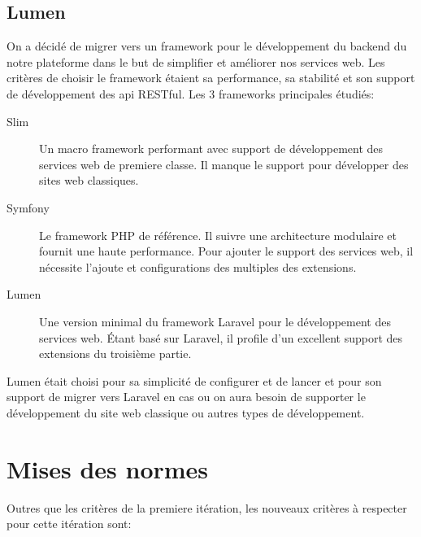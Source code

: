 \subsection{Lumen}

On a décidé de migrer vers un framework pour le développement du backend du
notre plateforme dans le but de simplifier et améliorer nos services web. Les
critères de choisir le framework étaient sa performance, sa stabilité et son
support de développement des api RESTful. Les 3 frameworks principales étudiés:

\begin{description}
    \item [Slim] Un macro framework performant avec support de développement
        des services web de premiere classe. Il manque le support pour
        développer des sites web classiques.
    \item [Symfony] Le framework PHP de référence. Il suivre une architecture
        modulaire et fournit une haute performance. Pour ajouter le support des
        services web, il nécessite l'ajoute et configurations des multiples des
        extensions.
    \item [Lumen] Une version minimal du framework Laravel pour le
        développement des services web. Étant basé sur Laravel, il profile d'un
        excellent support des extensions du troisième partie.
\end{description}

Lumen était choisi pour sa simplicité de configurer et de lancer et pour son
support de migrer vers Laravel en cas ou on aura besoin de supporter le
développement du site web classique ou autres types de développement.



\section{Mises des normes}

Outres que les critères de la premiere itération, les nouveaux critères à
respecter pour cette itération sont:

